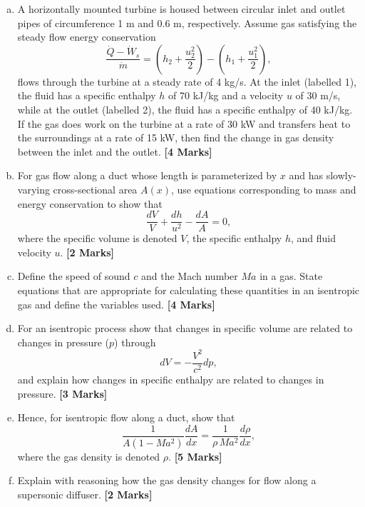 \documentclass[calculator,steamtables]{exam}
\newcommand{\frc}{\displaystyle\frac}
\begin{document}
\begin{question}\vspace{-2\baselineskip}

\begin{enumerate}[(a)]
%
\item A horizontally mounted turbine is housed between circular inlet and outlet pipes of circumference 1 m and 0.6 m, respectively. Assume gas satisfying the steady flow energy conservation
\begin{displaymath}
\frc{ \dot{Q} -\dot{W}_{s}}{\dot{m}} = \left( h_{2}+ \frc{u_{2}^{2}}{2}\right) - \left(h_{1} + \frc{u_{1}^{2}}{2}\right),
\end{displaymath}
flows through the turbine at a steady rate of 4 kg/s. At the inlet (labelled 1), the fluid has a specific enthalpy $h$ of 70 kJ/kg and a velocity $u$ of 30 m/s, while at the outlet (labelled 2), the fluid has a specific enthalpy of 40 kJ/kg. If the gas does work on the turbine at a rate of 30 kW and transfers heat to the surroundings at a rate of 15 kW, then find the change in gas density between the inlet and the outlet. {\bf [4 Marks]}

%
\item For gas flow along a duct whose length is parameterized by $x$ and has slowly-varying cross-sectional area  $A(x)$, use equations corresponding to mass and energy conservation to show that
\begin{displaymath}
\frc{dV}{V} + \frc{d h}{u^{2}} - \frc{dA}{A}=0,
\end{displaymath}
where the specific volume is denoted $V$, the specific enthalpy $h$, and fluid velocity $u$. {\bf [2 Marks]}
\medskip

\item Define the speed of sound $c$ and the Mach number $M\! a$ in a gas. State equations that are appropriate for calculating these quantities in an isentropic gas and define the variables used. {\bf [4 Marks]}
\medskip

\item For an isentropic process show that changes in specific volume are related to changes in pressure ($p$) through
\begin{displaymath}
dV=-\frc{V^{2}}{c^{2}}dp,
\end{displaymath}
and explain how changes in specific enthalpy are related to changes in pressure. {\bf [3 Marks]}
\medskip

\item Hence, for isentropic flow along a duct, show that
\begin{displaymath}
\frc{1}{A\left(1- M\! a^{2}\right)}\frc{dA}{dx} = \frc{1}{\rho \, M\! a^{2}}\frc{d\rho}{dx},
\end{displaymath}
where the gas density is denoted $\rho$. {\bf [5 Marks]}
\medskip

\item Explain with reasoning how the gas density changes for flow along a supersonic diffuser. {\bf [2 Marks]}
%
\end{enumerate}

\end{question}
\end{document}
